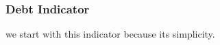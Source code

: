 \documentclass[11pt,a4paper]{article}
\begin{document}

\subsubsection{Debt Indicator}\label{sec:debt-indicator}
we start with this indicator because its simplicity.
\end{document}
